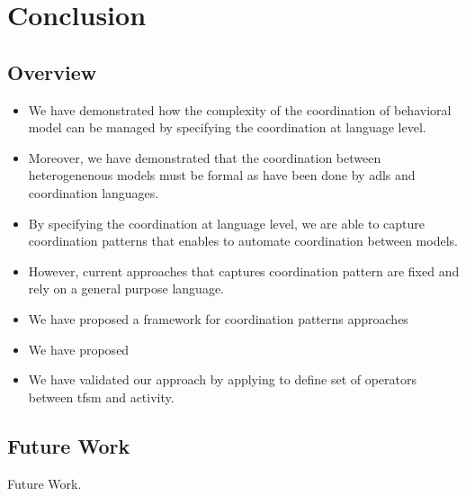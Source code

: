 \chapter{Conclusion}
\label{ch:conclusions}

\section{Overview}

\begin{itemize}
	\item We have demonstrated how the complexity of the coordination of behavioral model can be managed by specifying the coordination at language level.
	\item Moreover, we have demonstrated that the coordination between heterogenenous models must be formal as have been done by adls and coordination languages. 
	
	\item By specifying the coordination at language level, we are able to capture coordination patterns that enables to automate coordination between models. 
	
	\item However, current approaches that captures coordination pattern are fixed and rely on a general purpose language. 
	
	
	\item We have proposed a framework for coordination patterns approaches
	
	\item We have proposed \bcool 
	
	\item We have validated our approach by applying \bcool to define set of operators between tfsm and activity.  

	
\end{itemize}
\section{Future Work}

Future Work.